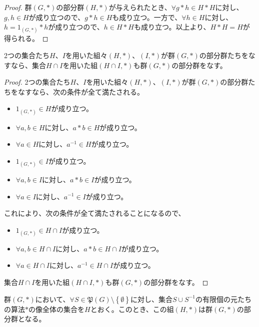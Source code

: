 \documentclass[dvipdfmx]{jsarticle}
\begin{document}
\begin{proof}
群$(G,*)$の部分群$(H,*)$が与えられたとき、$\forall g*h \in H*H$に対し、$g,h \in H$が成り立つので、$g*h \in H$も成り立つ。一方で、$\forall h \in H$に対し、$h = 1_{(G,*)}*h$が成り立つので、$h \in H*H$も成り立つ。以上より、$H*H = H$が得られる。
\end{proof}
\begin{thm}\label{3.1.1.10}
2つの集合たち$H$、$I$を用いた組々$(H,*)$、$(I,*)$が群$(G,*)$の部分群たちをなすなら、集合$H \cap I$を用いた組$(H \cap I,*)$も群$(G,*)$の部分群をなす。
\end{thm}
\begin{proof}
2つの集合たち$H$、$I$を用いた組々$(H,*)$、$(I,*)$が群$(G,*)$の部分群たちをなすなら、次の条件が全て満たされる。
\begin{itemize}
\item
  $1_{(G,*)} \in H$が成り立つ。
\item
  $\forall a,b \in H$に対し、$a*b \in H$が成り立つ。
\item
  $\forall a \in H$に対し、$a^{- 1} \in H$が成り立つ。
\item
  $1_{(G,*)} \in I$が成り立つ。
\item
  $\forall a,b \in I$に対し、$a*b \in I$が成り立つ。
\item
  $\forall a \in I$に対し、$a^{- 1} \in I$が成り立つ。
\end{itemize}
これにより、次の条件が全て満たされることになるので、
\begin{itemize}
\item
  $1_{(G,*)} \in H \cap I$が成り立つ。
\item
  $\forall a,b \in H \cap I$に対し、$a*b \in H \cap I$が成り立つ。
\item
  $\forall a \in H \cap I$に対し、$a^{- 1} \in H \cap I$が成り立つ。
\end{itemize}
集合$H \cap I$を用いた組$(H \cap I,*)$も群$(G,*)$の部分群をなす。
\end{proof}
\begin{thm}\label{3.1.1.11}
群$(G,*)$において、$\forall S \in \mathfrak{P}(G) \setminus \left\{ \emptyset  \right\}$に対し、集合$S \cup S^{- 1}$の有限個の元たちの算法$*$の像全体の集合を$H$とおく。このとき、この組$(H,*)$は群$(G,*)$の部分群となる。
\end{thm}
\end{document}
